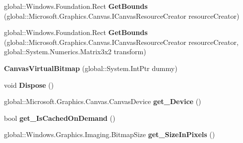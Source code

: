 \begin{DoxyCompactItemize}
global\+::\+Windows.\+Foundation.\+Rect {\bfseries Get\+Bounds} (global\+::\+Microsoft.\+Graphics.\+Canvas.\+I\+Canvas\+Resource\+Creator resource\+Creator)
\item 
\mbox{\label{class_microsoft_1_1_graphics_1_1_canvas_1_1_canvas_virtual_bitmap_aaa158707cfd84b8d995986896e041c86}} 
global\+::\+Windows.\+Foundation.\+Rect {\bfseries Get\+Bounds} (global\+::\+Microsoft.\+Graphics.\+Canvas.\+I\+Canvas\+Resource\+Creator resource\+Creator, global\+::\+System.\+Numerics.\+Matrix3x2 transform)
\item 
\mbox{\label{class_microsoft_1_1_graphics_1_1_canvas_1_1_canvas_virtual_bitmap_aeaea1d4461bcea11a0a08b9543be5651}} 
{\bfseries Canvas\+Virtual\+Bitmap} (global\+::\+System.\+Int\+Ptr dummy)
\item 
\mbox{\label{class_microsoft_1_1_graphics_1_1_canvas_1_1_canvas_virtual_bitmap_aaf949a1a2cfd013fee6beb63ae18107c}} 
void {\bfseries Dispose} ()
\item 
\mbox{\label{class_microsoft_1_1_graphics_1_1_canvas_1_1_canvas_virtual_bitmap_add2a220c3a0d0912f49273fd03bc60ef}} 
global\+::\+Microsoft.\+Graphics.\+Canvas.\+Canvas\+Device {\bfseries get\+\_\+\+Device} ()
\item 
\mbox{\label{class_microsoft_1_1_graphics_1_1_canvas_1_1_canvas_virtual_bitmap_a37a9831f455bc5cc3a218d38d784c58a}} 
bool {\bfseries get\+\_\+\+Is\+Cached\+On\+Demand} ()
\item 
\mbox{\label{class_microsoft_1_1_graphics_1_1_canvas_1_1_canvas_virtual_bitmap_a439d7c35ef18134d0591a7224da39d45}} 
global\+::\+Windows.\+Graphics.\+Imaging.\+Bitmap\+Size {\bfseries get\+\_\+\+Size\+In\+Pixels} ()
\item 
\mbox{\label{class_microsoft_1_1_graphics_1_1_canvas_1_1_canvas_virtual_bitmap_a3666de30987670dccd0b71e58afa0622}} 

\end{DoxyCompactItemize}
